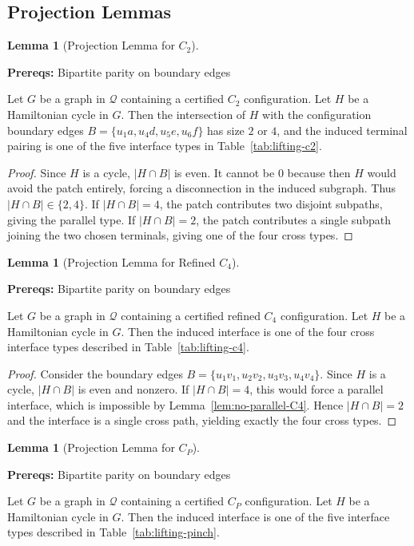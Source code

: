 \documentclass[12pt]{article}
\theoremstyle{definition}
\newtheorem{lemma}[theorem]{Lemma}
\newcommand{\prereq}[1]{\par\noindent\textbf{Prereqs:} #1\par}
\begin{document}
\subsection{Projection Lemmas}
\label{subsec:projection-lemmas}

\begin{lemma}[Projection Lemma for $C_2$]
\label{lem:projection-c2}
\prereq{Bipartite parity on boundary edges}
Let $G$ be a graph in $\mathcal{Q}$ containing a certified $C_2$ configuration. Let $H$ be a Hamiltonian cycle in $G$. Then the intersection of $H$ with the configuration boundary edges $B = \{u_1a, u_4d, u_5e, u_6f\}$ has size $2$ or $4$, and the induced terminal pairing is one of the five interface types in Table~\ref{tab:lifting-c2}.
\end{lemma}

\begin{proof}
Since $H$ is a cycle, $|H\cap B|$ is even. It cannot be $0$ because then $H$ would avoid the patch entirely, forcing a disconnection in the induced subgraph. Thus $|H\cap B|\in\{2,4\}$.
If $|H\cap B|=4$, the patch contributes two disjoint subpaths, giving the parallel type.
If $|H\cap B|=2$, the patch contributes a single subpath joining the two chosen terminals, giving one of the four cross types.
\end{proof}

\begin{lemma}[Projection Lemma for Refined $C_4$]
\label{lem:proj-C4}
\prereq{Bipartite parity on boundary edges}
Let $G$ be a graph in $\mathcal{Q}$ containing a certified refined $C_4$ configuration. Let $H$ be a Hamiltonian cycle in $G$. Then the induced interface is one of the four cross interface types described in Table~\ref{tab:lifting-c4}.
\end{lemma}

\begin{proof}
Consider the boundary edges $B = \{u_1v_1, u_2v_2, u_3v_3, u_4v_4\}$. Since $H$ is a cycle, $|H \cap B|$ is even and nonzero.
If $|H\cap B|=4$, this would force a parallel interface, which is impossible by Lemma~\ref{lem:no-parallel-C4}. Hence $|H\cap B|=2$ and the interface is a single cross path, yielding exactly the four cross types.
\end{proof}

\begin{lemma}[Projection Lemma for $C_P$]
\label{lem:projection-pinch}
\prereq{Bipartite parity on boundary edges}
Let $G$ be a graph in $\mathcal{Q}$ containing a certified $C_P$ configuration. Let $H$ be a Hamiltonian cycle in $G$. Then the induced interface is one of the five interface types described in Table~\ref{tab:lifting-pinch}.
\end{lemma}
\end{document}
